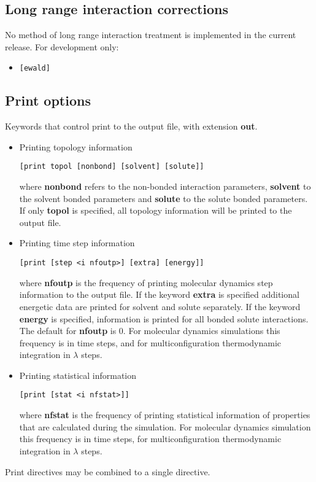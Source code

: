 \subsection{Long range interaction corrections}
No method of long range interaction treatment is implemented in the
current release. For development only:
\begin{itemize}
\item
\begin{verbatim}
[ewald]
\end{verbatim}
\end{itemize}
\subsection{Print options}
Keywords that control print to the output file, with extension {\bf out}.
\begin{itemize}
\item
Printing topology information
\begin{verbatim}
[print topol [nonbond] [solvent] [solute]]
\end{verbatim}
where {\bf nonbond} refers to the non-bonded interaction parameters,
{\bf solvent} to the solvent bonded parameters and {\bf solute} to the
solute bonded parameters. If only {\bf topol} is specified, all
topology information will be printed to the output file.
\item
Printing time step information
\begin{verbatim}
[print [step <i nfoutp>] [extra] [energy]]
\end{verbatim}
where {\bf nfoutp} is the frequency of printing molecular dynamics step
information to the output file. If the keyword {\bf extra} is specified
additional energetic data are printed for solvent and solute separately.
If the keyword {\bf energy} is specified, information is printed for
all bonded solute interactions.
The default for {\bf nfoutp} is 0. For molecular dynamics simulations
this frequency is in time steps, and for multiconfiguration thermodynamic
integration in $\lambda$ steps.
\item
Printing statistical information
\begin{verbatim}
[print [stat <i nfstat>]]
\end{verbatim}
where {\bf nfstat} is the frequency of printing statistical information
of properties that are calculated during the simulation. 
For molecular dynamics simulation
this frequency is in time steps, for multiconfiguration thermodynamic
integration in $\lambda$ steps.
\end{itemize}
Print directives may be combined to a single directive.
